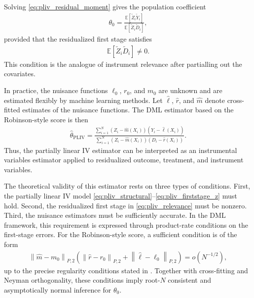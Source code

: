 \documentclass[12pt,a4paper]{article}
\newcommand{\E}{\mathbb{E}}
\begin{document}
Solving \eqref{eq:pliv_residual_moment} gives the population coefficient
\begin{align}
    \theta_0
    =
    \frac{
        \E[\widetilde{Z}_i \widetilde{Y}_i]
    }{
        \E[\widetilde{Z}_i \widetilde{D}_i]
    },
    \label{eq:pliv_population_ratio}
\end{align}
provided that the residualized first stage satisfies
\begin{align}
    \E[\widetilde{Z}_i \widetilde{D}_i] \neq 0.
    \label{eq:pliv_relevance}
\end{align}
This condition is the analogue of instrument relevance after partialling out the covariates.

In practice, the nuisance functions \(\ell_0\), \(r_0\), and \(m_0\) are unknown and are
estimated flexibly by machine learning methods. Let \(\hat{\ell}\), \(\hat r\), and
\(\hat m\) denote cross-fitted estimates of the nuisance functions. The DML estimator based
on the Robinson-style score is then
\begin{align}
    \hat{\theta}_{\mathrm{PLIV}}
    =
    \frac{
        \sum_{i=1}^N
        \left(Z_i-\hat m(X_i)\right)
        \left(Y_i-\hat{\ell}(X_i)\right)
    }{
        \sum_{i=1}^N
        \left(Z_i-\hat m(X_i)\right)
        \left(D_i-\hat r(X_i)\right)
    }.
    \label{eq:pliv_dml_estimator}
\end{align}
Thus, the partially linear IV estimator can be interpreted as an instrumental variables
estimator applied to residualized outcome, treatment, and instrument variables.

The theoretical validity of this estimator rests on three types of conditions. First, the
partially linear IV model \eqref{eq:pliv_structural}--\eqref{eq:pliv_firststage_z} must hold.
Second, the residualized first stage in \eqref{eq:pliv_relevance} must be nonzero. Third,
the nuisance estimators must be sufficiently accurate. In the DML framework, this requirement
is expressed through product-rate conditions on the first-stage errors. For the Robinson-style
score, a sufficient condition is of the form
\begin{align}
    \left\|
        \hat m - m_0
    \right\|_{P,2}
    \left(
        \left\|
            \hat r-r_0
        \right\|_{P,2}
        +
        \left\|
            \hat{\ell}-\ell_0
        \right\|_{P,2}
    \right)
    =
    o(N^{-1/2}),
    \label{eq:pliv_product_rate}
\end{align}
up to the precise regularity conditions stated in \citet[Assumption~4.2]{chernozhukov2018double}.
Together with cross-fitting and Neyman orthogonality, these conditions imply root-\(N\)
consistent and asymptotically normal inference for \(\theta_0\).
\end{document}
